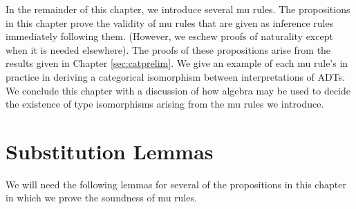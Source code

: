 \documentclass{msthesis}
\newtheorem{lemma}[theorem]{Lemma}
\theoremstyle{definition}
\newtheorem*{notation}{Notation}
\newcommand{\semof}[1]{\llbracket{#1}\rrbracket}
\newcommand{\mcC}{\mathcal{C}}
\newcommand{\vars}{\mathbb{V}}
\newcommand{\wars}{\mathbb{W}}
\begin{document}
In the remainder of this chapter, we introduce several mu rules.  The propositions in this chapter prove the validity of mu rules that are given as inference rules immediately following them. (However, we eschew proofs of naturality except when it is needed elsewhere).  The proofs of these propositions arise from the results given in Chapter \ref{sec:catprelim}.  We give an example of each mu rule's in practice in deriving a categorical isomorphism between interpretations of ADTs.  We conclude this chapter with a discussion of how algebra may be used to decide the existence of type isomorphisms arising from the mu rules we introduce.

\section{Substitution Lemmas}
We will need the following lemmas for several of the propositions in this chapter in which we prove the soundness of mu rules.





         
\end{document}
